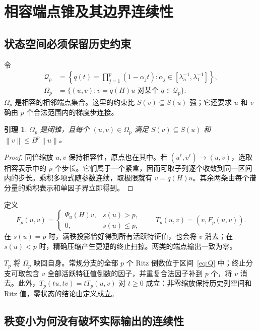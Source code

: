 \documentclass[UTF8,zihao=-4,a4paper]{ctexart}
\newtheorem{lemma}[theorem]{引理}
\theoremstyle{definition}\newtheorem{example}[theorem]{例}
\newcommand{\norm}[1]{\left\lVert#1\right\rVert}
\begin{document}
\section{相容端点锥及其边界连续性}

\subsection{状态空间必须保留历史约束}

令
\begin{align}
 \mathcal Q_p&=\left\{q(t)=\prod_{j=1}^p(1-\alpha_jt):
                \alpha_j\in[\lambda_n^{-1},\lambda_1^{-1}]\right\},\label{eq:Q}\\
 \Omega_p&=\{(u,v):v=q(H)u\text{ 对某个 }q\in\mathcal Q_p\}.\label{eq:cone}
\end{align}
$\Omega_p$ 是相容的相邻端点集合。这里的约束比 $S(v)\subseteq S(u)$ 强；它还要求 $u$ 和 $v$ 确由 $p$ 个合法范围内的梯度步连接。

\begin{lemma}\label{lem:closed}
$\Omega_p$ 是闭锥，且每个 $(u,v)\in\Omega_p$ 满足
$S(v)\subseteq S(u)$ 和 $\norm v\le B^p\norm u$。
\end{lemma}
\begin{proof}
同倍缩放 $u,v$ 保持相容性，原点也在其中。若 $(u^\ell,v^\ell)\to(u,v)$，选取相容表示中的 $p$ 个步长。它们属于一个紧盒，因而可取子列逐个收敛到同一区间内的步长。乘积多项式随参数连续，取极限就有 $v=q(H)u$。其余两条由每个谱分量的乘积表示和单因子界立即得到。
\end{proof}

定义
\begin{equation}\label{eq:F}
 F_p(u,v)=\begin{cases}\Psi_u(H)v,&s(u)>p,\\0,&s(u)\le p,\end{cases}
 \qquad T_p(u,v)=(v,F_p(u,v)).
\end{equation}
在 $s(u)=p$ 时，满秩投影恰好得到所有活跃特征值，也会将 $v$ 消去；在 $s(u)<p$ 时，精确压缩产生更短的终止扫掠。两类的端点输出一致为零。

$T_p$ 将 $\Omega_p$ 映回自身。常规分支的全部 $p$ 个 Ritz 倒数位于区间~\eqref{eq:Q} 中；终止分支可取包含 $v$ 全部活跃特征值倒数的因子，并重复合法因子补到 $p$ 个，将 $v$ 消去。此外，$T_p(tu,tv)=tT_p(u,v)$ 对 $t\ge0$ 成立：非零缩放保持历史列空间和 Ritz 值，零状态的结论由定义成立。

\subsection{秩变小为何没有破坏实际输出的连续性}
\end{document}
